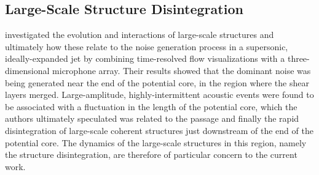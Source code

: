 \subsection{Large-Scale Structure Disintegration}
\citet{Hileman2005} investigated the evolution and interactions of large-scale structures and ultimately how these relate to the noise generation process in a supersonic, ideally-expanded jet by combining time-resolved flow visualizations with a three-dimensional microphone array.
Their results showed that the dominant noise was being generated near the end of the potential core, in the region where the shear layers merged.
Large-amplitude, highly-intermittent acoustic events were found to be associated with a fluctuation in the length of the potential core, which the authors ultimately speculated was related to the passage and finally the rapid disintegration of large-scale coherent structures just downstream of the end of the potential core.
The dynamics of the large-scale structures in this region, namely the structure disintegration, are therefore of particular concern to the current work.

